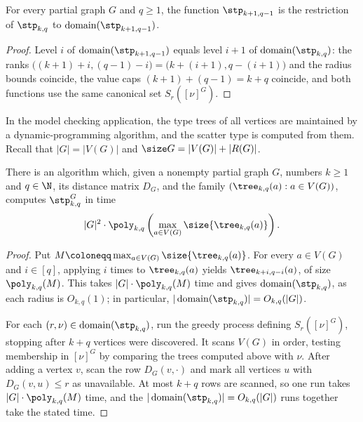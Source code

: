 \begin{lemma}\label{obs:stp-restrict}
For every partial graph $G$ and $q\ge 1$, the function $\stp_{k+1,q-1}$ is the restriction of $\stp_{k,q}$ to $\operatorname{domain}(\stp_{k+1,q-1})$.
\end{lemma}
\begin{proof}
Level $i$ of $\operatorname{domain}(\stp_{k+1,q-1})$ equals level $i+1$ of $\operatorname{domain}(\stp_{k,q})$: the ranks $\bigl((k+1)+i,(q-1)-i\bigr)=\bigl(k+(i+1),q-(i+1)\bigr)$ and the radius bounds coincide, the value caps $(k+1)+(q-1)=k+q$ coincide, and both functions use the same canonical set $S_r([\nu]^G)$.
\end{proof}

In the model checking application, the type trees of all vertices are maintained by a dynamic-programming algorithm, and the scatter type is computed from them.
Recall that $|G|=|V(G)|$ and $\size G=|V(G)|+|R(G)|$.

\begin{lemma}\label{lem:compute-stp}
There is an algorithm which, given a nonempty partial graph $G$, numbers
$k\ge1$ and $q\in\N$, its distance matrix $D_G$, and the family
$(\tree_{k,q}(a):a\in V(G))$, computes $\stp^G_{k,q}$ in time
\[
|G|^2\cdot
\poly_{k,q}\left(\max_{a\in V(G)}\size{\tree_{k,q}(a)}\right).
\]
\end{lemma}
\begin{proof}
Put $M\coloneqq\max_{a\in V(G)}\size{\tree_{k,q}(a)}$.
For every $a\in V(G)$ and $i\in[q]$, applying  $i$ times to $\tree_{k,q}(a)$ yields $\tree_{k+i,q-i}(a)$, of size $\poly_{k,q}(M)$.
This takes $|G|\cdot\poly_{k,q}(M)$ time and gives $\operatorname{domain}(\stp_{k,q})$, as each radius is $O_{k,q}(1)$; in particular, $|\operatorname{domain}(\stp_{k,q})|=O_{k,q}(|G|)$.

For each $(r,\nu)\in \operatorname{domain}(\stp_{k,q})$, run the greedy process defining $S_r([\nu]^G)$, stopping after $k+q$ vertices were discovered.
It scans $V(G)$ in order, testing membership in $[\nu]^G$ by comparing the trees computed above with $\nu$. After adding a vertex $v$, scan the row $D_G(v,\cdot)$ and mark all vertices $u$ with $D_G(v,u)\le r$ as unavailable.
At most $k+q$ rows are scanned, so one run takes $|G|\cdot\poly_{k,q}(M)$ time, and the $|\operatorname{domain}(\stp_{k,q})|=O_{k,q}(|G|)$ runs together take the stated time.
\end{proof}

